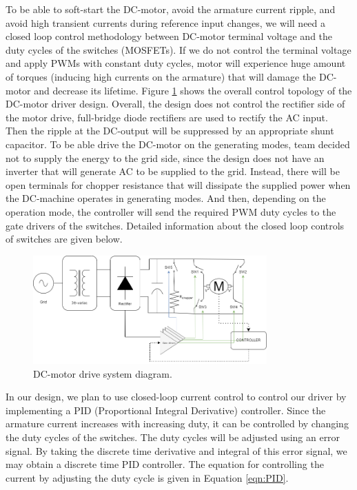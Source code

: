 To be able to soft-start the DC-motor, avoid the armature current ripple, and avoid high transient currents during reference input changes, we will need a closed loop control methodology between DC-motor terminal voltage and the duty cycles of the switches (MOSFETs). If we do not control the terminal voltage and apply PWMs with constant duty cycles, motor will experience huge amount of torques (inducing high currents on the armature) that will damage the DC-motor and decrease its lifetime. Figure \ref{fig:overall_diagram} shows the overall control topology of the DC-motor driver design. Overall, the design does not control the rectifier side of the motor drive, full-bridge diode rectifiers are used to rectify the AC input. Then the ripple at the DC-output will be suppressed by an appropriate shunt capacitor. To be able drive the DC-motor on the generating modes, team decided not to supply the energy to the grid side, since the design does not have an inverter that will generate AC to be supplied to the grid. Instead, there will be open terminals for chopper resistance that will dissipate the supplied power when the DC-machine operates in generating modes. And then, depending on the operation mode, the controller will send the required PWM duty cycles to the gate drivers of the switches. Detailed information about the closed loop controls of switches are given below.

\begin{figure}[H]
    \centering
    \includegraphics[width=0.8\textwidth]{Figures/topology_deneme.png}
    \caption{DC-motor drive system diagram.}
    \label{fig:overall_diagram}
\end{figure}

In our design, we plan to use closed-loop current control to control our driver by implementing a PID (Proportional Integral Derivative) controller. Since the armature current increases with increasing duty, it can be controlled by changing the duty cycles of the switches. The duty cycles will be adjusted using an error signal. By taking the discrete time derivative and integral of this error signal, we may obtain a discrete time PID controller. The equation for controlling the current by adjusting the duty cycle is given in Equation \ref{eqn:PID}.

